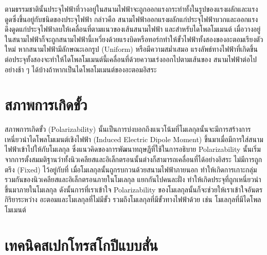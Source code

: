 ตามธรรมชาตินั้นประจุไฟฟ้าที่วางอยู่ในสนามไฟฟ้าจะถูกออกแรงกระทำทั้งในรูปของแรงผลักและแรงดูดซึ่งขึ้นอยู่กับชนิดของประจุไฟฟ้า กล่าวคือ%
สนามไฟฟ้าออกแรงผลักแก่ประจุไฟฟ้าบวกและออกแรงดึงดูดแก่ประจุไฟฟ้าลบให้เคลื่อนที่ตามแนวของเส้นสนามไฟฟ้า และสําหรับไดโพลโมเมนต์%
เมื่อวางอยู่ในสนามไฟฟ้าก็จะถูกสนามไฟฟ้านี้เหวี่ยงด้วยแรงบิดหรือทอร์กทําให้ขั้วไฟฟ้าทั้งสองของอะตอมเรียงตัวใหม่ หากสนามไฟฟ้ามีลักษณะเอกรูป
(Uniform) หรือมีความสม่ำเสมอ แรงลัพธ์ทางไฟฟ้าที่เกิดขึ้นต่อประจุทั้งสองจะทําให้ไดโพลโมเมนต์นี้เคลื่อนที่ด้วยความเร่งออกไปตามเส้นของ%
สนามไฟฟ้าต่อไปอย่างช้า ๆ ได้บ้างถ้าหากเป็นไดโพลโมเมนต์ของอะตอมอิสระ

\section{สภาพการเกิดขั้ว}
\label{sec:polariz}

สภาพการเกิดขั้ว (Polarizability) นั้นเป็นการบ่งบอกถึงแนวโน้มที่โมเลกุลนั้นจะมีการสร้างการเหนี่ยวนำไดโพลโมเมนต์เชิงไฟฟ้า (Induced 
Electric Dipole Moment) ขึ้นมาเมื่อมีการใส่สนามไฟฟ้าเข้าไปให้กับโมเลกุล ซึ่งแนวคิดของการพัฒนาทฤษฎีที่ใช้ในการอธิบาย Polarizability 
นั้นเริ่มจากการตั้งสมมติฐานว่าทั้งนิวเคลียสและอิเล็กตรอนนั้นต่างก็สามารถเคลื่อนที่ได้อย่างอิสระ ไม่มีการถูกตรึง (Fixed) ไว้อยู่กับที่ 
เมื่อโมเลกุลนั้นถูกรบกวนด้วยสนามไฟฟ้าภายนอก ทำให้เกิดการเกาะกลุ่มรวมกันของนิวเคลียสและอิเล็กตรอนภายในโมเลกุล แยกกันไปคนละฝั่ง 
ทำให้เกิดประจุที่ถูกเหนี่ยวนำขึ้นมาภายในโมเลกุล ดังนั้นการที่เราเข้าใจ Polarizability ของโมเลกุลนั้นก็จะช่วยให้เราเข้าใจอันตรกิริยาระหว่าง%
อะตอมและโมเลกุลที่ไม่มีขั้ว รวมถึงโมเลกุลที่มีขั้วทางไฟฟ้าด้วย เช่น โมเลกุลที่มีไดโพลโมเมนต์

\section{เทคนิคสเปกโทรสโกปีแบบสั่น}
\label{sec:spectro}

